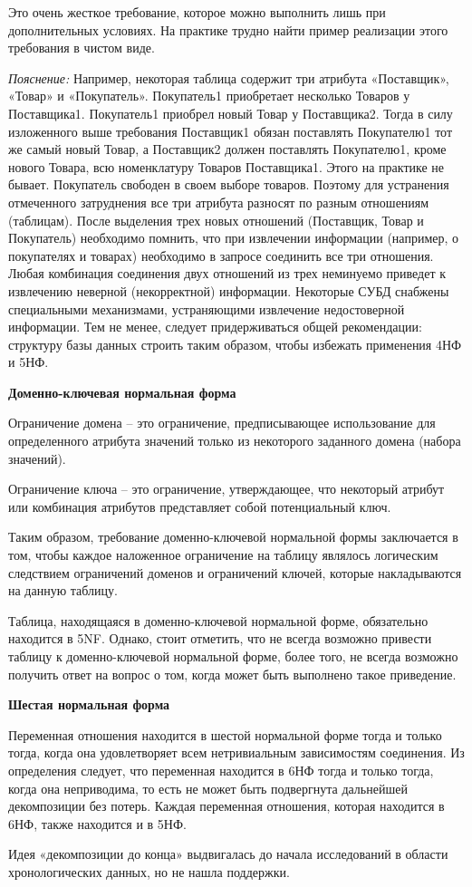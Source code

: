Это очень жесткое требование, которое можно выполнить лишь при дополнительных условиях. На практике трудно найти пример реализации этого требования в чистом виде.

\textit{Пояснение:} Например, некоторая таблица содержит три атрибута «Поставщик», «Товар» и «Покупатель». Покупатель1 приобретает несколько Товаров у Поставщика1. Покупатель1 приобрел новый Товар у Поставщика2. Тогда в силу изложенного выше требования Поставщик1 обязан поставлять Покупателю1 тот же самый новый Товар, а Поставщик2 должен поставлять Покупателю1, кроме нового Товара, всю номенклатуру Товаров Поставщика1. Этого на практике не бывает. Покупатель свободен в своем выборе товаров. Поэтому для устранения отмеченного затруднения все три атрибута разносят по разным отношениям (таблицам). После выделения трех новых отношений (Поставщик, Товар и Покупатель) необходимо помнить, что при извлечении информации (например, о покупателях и товарах) необходимо в запросе соединить все три отношения. Любая комбинация соединения двух отношений из трех неминуемо приведет к извлечению неверной (некорректной) информации. Некоторые СУБД снабжены специальными механизмами, устраняющими извлечение недостоверной информации. Тем не менее, следует придерживаться общей рекомендации: структуру базы данных строить таким образом, чтобы избежать применения 4НФ и 5НФ.



\textbf{Доменно-ключевая нормальная форма}

Ограничение домена – это ограничение, предписывающее использование для определенного атрибута значений только из некоторого заданного домена (набора значений).

Ограничение ключа – это ограничение, утверждающее, что некоторый атрибут или комбинация атрибутов представляет собой потенциальный ключ.

Таким образом, требование доменно-ключевой нормальной формы заключается в том, чтобы каждое наложенное ограничение на таблицу являлось логическим следствием ограничений доменов и ограничений ключей, которые накладываются на данную таблицу.

Таблица, находящаяся в доменно-ключевой нормальной форме, обязательно находится в 5NF. Однако, стоит отметить, что не всегда возможно привести таблицу к доменно-ключевой нормальной форме, более того, не всегда возможно получить ответ на вопрос о том, когда может быть выполнено такое приведение.

\textbf{Шестая нормальная форма}

Переменная отношения находится в шестой нормальной форме тогда и только тогда, когда она удовлетворяет всем нетривиальным зависимостям соединения. Из определения следует, что переменная находится в 6НФ тогда и только тогда, когда она неприводима, то есть не может быть подвергнута дальнейшей декомпозиции без потерь. Каждая переменная отношения, которая находится в 6НФ, также находится и в 5НФ.

Идея «декомпозиции до конца» выдвигалась до начала исследований в области хронологических данных, но не нашла поддержки.
